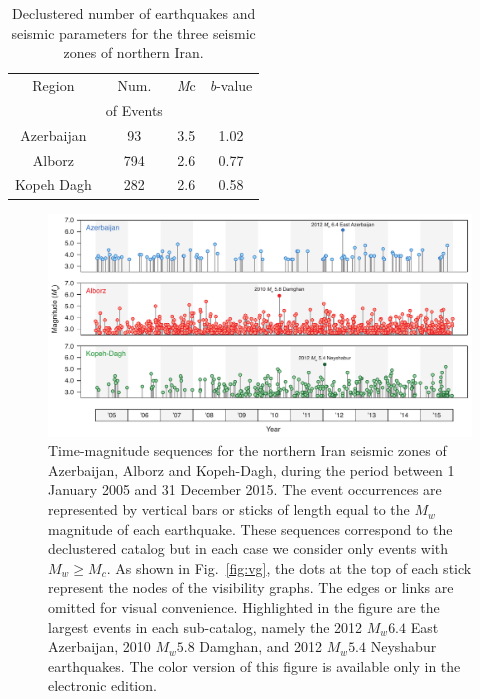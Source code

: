 \begin{table}
	\selectfont
	\caption{Declustered number of earthquakes and seismic parameters for the three seismic zones of northern Iran.}
	\centering\small
	\begin{tabular}{|cccc|}
		\hline
		Region      & Num.      & \textit{M}c & \textit{b}-value \\ 
		            & of Events &             &                  \\
		\hline
		Azerbaijan  &        93 &         3.5 &             1.02 \\
		Alborz      &       794 &         2.6 &             0.77 \\
		Kopeh Dagh  &       282 &         2.6 &             0.58 \\
		\hline
	\end{tabular}
	\label{tab:seismicity}
\end{table}

\begin{figure}[t]
	\centering
	\includegraphics[width=\textwidth]{figures/pdf/figure-05} 
	\caption{Time-magnitude sequences for the northern Iran seismic zones of Azerbaijan, Alborz and Kopeh-Dagh, during the period between 1 January 2005 and 31 December 2015. The event occurrences are represented by vertical bars or sticks of length equal to the $M_w$ magnitude of each earthquake. These sequences correspond to the declustered catalog but in each case we consider only events with $M_w \geq M_c$. As shown in Fig.~\ref{fig:vg}, the dots at the top of each stick represent the nodes of the visibility graphs. The edges or links are omitted for visual convenience. Highlighted in the figure are the largest events in each sub-catalog, namely the 2012 $M_w 6.4$ East Azerbaijan, 2010 $M_w 5.8$ Damghan, and 2012 $M_w 5.4$ Neyshabur earthquakes. The color version of this figure is available only in the electronic edition.}
	\label{fig:mag-time}
\end{figure}

